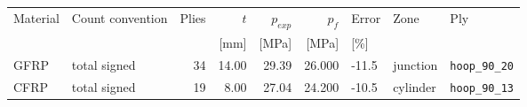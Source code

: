 \begin{tabular}{llrrrrlll}
\toprule
Material & Count convention & Plies & $t$ & $p_{exp}$ & $p_f$ & Error & Zone & Ply\\
 & & & [mm] & [MPa] & [MPa] & [\%] & & \\
\midrule
GFRP & total signed & 34 & 14.00 & 29.39 & 26.000 & -11.5 & junction & \texttt{hoop\_90\_20}\\
CFRP & total signed & 19 & 8.00 & 27.04 & 24.200 & -10.5 & cylinder & \texttt{hoop\_90\_13}\\
\bottomrule
\end{tabular}
